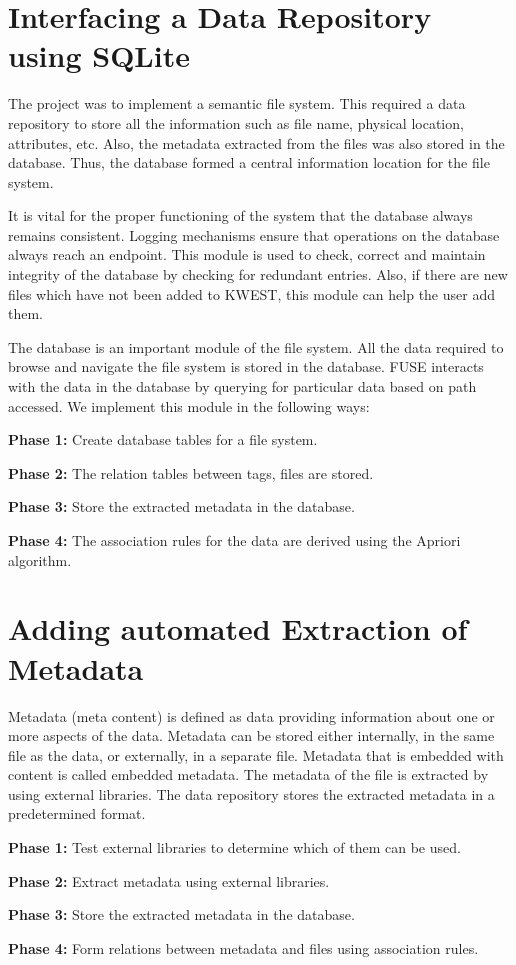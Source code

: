 \section{Interfacing a Data Repository using SQLite}
The project was to implement a semantic file system. This required a data repository to store all the information such as file name, physical location, attributes, etc. Also, the metadata extracted from the files was also stored in the database. Thus, the database formed a central information location for the file system.


It is vital for the proper functioning of the system that the database always remains consistent. Logging mechanisms ensure that operations on the database always reach an endpoint. This module is used to check, correct and maintain integrity of the database by checking for redundant entries. Also, if there are new files which have not been added to KWEST, this module can help the user add them.


The database is an important module of the file system. All the data required to browse and navigate the file system is stored in the database. FUSE interacts with the data in the database by querying for particular data based on path accessed. We implement this module in the following ways:
\begin{list}{•}{•}
\item \textbf{Phase 1:} Create database tables for a file system.
\item \textbf{Phase 2:} The relation tables between tags, files are stored.
\item \textbf{Phase 3:} Store the extracted metadata in the database.
\item \textbf{Phase 4:} The association rules for the data are derived using the Apriori algorithm.
\end{list}

\section{Adding automated Extraction of Metadata}
Metadata (meta content) is defined as data providing information about one or more aspects of the data. Metadata can be stored either internally, in the same file as the data, or externally, in a separate file. Metadata that is embedded with content is called embedded metadata.
The metadata of the file is extracted by using external libraries. The data repository stores the extracted metadata in a predetermined format. 
\begin{list}{•}{•}
\item \textbf{Phase 1:} Test external libraries to determine which of them can be used.
\item \textbf{Phase 2:} Extract metadata using external libraries.
\item \textbf{Phase 3:} Store the extracted metadata in the database.
\item \textbf{Phase 4:} Form relations between metadata and files using association rules.
\end{list}

